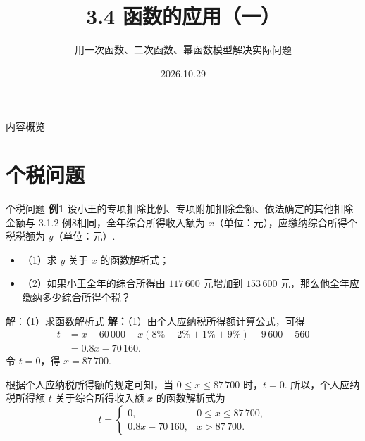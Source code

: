 \documentclass[aspectratio=169,13pt,t] {beamer}
\title[3.4函数的应用（一）]{3.4 函数的应用（一）}
\subtitle{用一次函数、二次函数、幂函数模型解决实际问题}
\author[好好学习，努力向上]{}
\institute{}
\date{2026.10.29}
\theoremstyle{definition}
\begin{document}
\begin{frame}{}
	\titlepage
\end{frame}

\begin{frame}{内容概览}
	\tableofcontents
\end{frame}

\section{个税问题}

	\begin{frame}{个税问题}
	\textbf{例1} 设小王的专项扣除比例、专项附加扣除金额、依法确定的其他扣除金额与 3.1.2 例8相同，全年综合所得收入额为 \(x\)（单位：元），应缴纳综合所得个税税额为 \(y\)（单位：元）.
	\begin{itemize}
		\item （1）求 \(y\) 关于 \(x\) 的函数解析式；
		\item （2）如果小王全年的综合所得由 \(117\,600\) 元增加到 \(153\,600\) 元，那么他全年应缴纳多少综合所得个税？
	\end{itemize}
	
	\vspace{0.5em}
\end{frame}

\begin{frame}{解：（1）求函数解析式}
	\textbf{解：}（1）由个人应纳税所得额计算公式，可得
	\begin{align*}
		t &= x - 60\,000 - x(8\% + 2\% + 1\% + 9\%) - 9\,600 - 560 \\
		&= 0.8x - 70\,160.
	\end{align*}
	令 \(t=0\)，得 \(x=87\,700\).
	
	根据个人应纳税所得额的规定可知，当 \(0 \leqslant x \leqslant 87\,700\) 时，\(t=0\). 所以，个人应纳税所得额 \(t\) 关于综合所得收入额 \(x\) 的函数解析式为
	\[
	t = \begin{cases}
		0, & 0 \leqslant x \leqslant 87\,700, \\
		0.8x - 70\,160, & x > 87\,700.
	\end{cases}
	\]
\end{frame}
\end{document}
